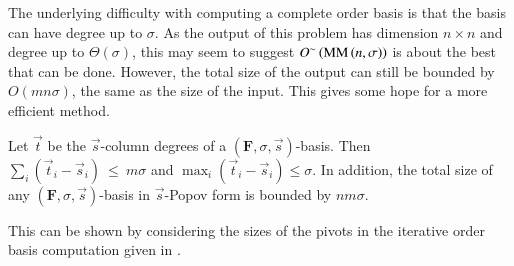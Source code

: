 The underlying difficulty with computing a complete order basis is
that the basis can have degree up to $\sigma$. As the output of this
problem has dimension $n\times n$ and degree up to $\Theta\left(\sigma\right)$,
this may seem to suggest $O^{\sim}\left(\MM\left(n,\sigma\right)\right)$
is about the best that can be done. However, the total size of the
output can still be bounded by $O\left(mn\sigma\right)$, the same
as the size of the input. This gives some hope for a more efficient
method. 
\begin{lem}
\label{lem:size}Let $\vec{t}$ be the $\vec{s}$-column degrees of
a $\left(\mathbf{F},\sigma,\vec{s}\right)$-basis. Then $\sum_{i}\left(\vec{t}_{i}-\vec{s}_{i}\right)~\le~m\sigma$
and \textup{$\max_{i}\left(\vec{t}_{i}-\vec{s}_{i}\right)\le\sigma$}.
In addition, the total size of any $\left(\mathbf{F},\sigma,\vec{s}\right)$-basis
in $\vec{s}$-Popov form is bounded by $nm\sigma$. \end{lem}
\begin{pf}
This can be shown by considering the sizes of the pivots in the iterative
order basis computation given in \citep{BeLa94,Giorgi2003}. %
\begin{comment}
Consider the degree of pivot entries in the iterative order basis
computation from \citet{BeLa94}. Starting at order zero, for each
order increasing by one, the sum of the degrees of all the pivot entries
is increased by at most $m$. Hence the sum is at most $m\sigma$
after $\sigma$ increases for an order $\sigma$ order basis. Now
consider any particular column of the basis. Each entry in the column
has degree bounded by the corresponding pivot entry of the row, so
the total degree of the entries in the column is bounded by $m\sigma$.
Therefore, the size of any order $\sigma$ basis with $n$ columns
is bounded by $nm\sigma$ coefficients. 
\end{comment}
{} 
\end{pf}
%
\begin{comment}
As a result, the average degree of the entries of the output matrix
can be also bounded by $d=m\sigma/n$. 
\end{comment}
{}

